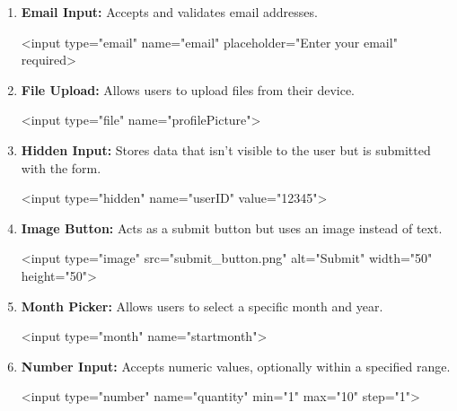 \documentclass{report}
\begin{document}
\begin{itemize}
\begin{enumerate}
            \item \textbf{Email Input:} Accepts and validates email addresses.
                \bigbreak \noindent 
                \begin{htmlcode}
                    <input type="email" name="email" placeholder="Enter your email" required>
                \end{htmlcode}
                
            \item \textbf{File Upload:} Allows users to upload files from their device.
                \bigbreak \noindent 
                \begin{htmlcode}
                    <input type="file" name="profilePicture">
                \end{htmlcode}

            \item \textbf{Hidden Input:} Stores data that isn’t visible to the user but is submitted with the form.
                \bigbreak \noindent 
                \begin{htmlcode}
                    <input type="hidden" name="userID" value="12345">
                \end{htmlcode}
                
            \item \textbf{Image Button:} Acts as a submit button but uses an image instead of text.
                \bigbreak \noindent 
                \begin{htmlcode}
                    <input type="image" src="submit_button.png" alt="Submit" width="50" height="50">
                \end{htmlcode}
                
            \item \textbf{Month Picker:} Allows users to select a specific month and year.
                \bigbreak \noindent 
                \begin{htmlcode}
                    <input type="month" name="startmonth">
                \end{htmlcode}
                
            \item \textbf{Number Input:} Accepts numeric values, optionally within a specified range.
                \bigbreak \noindent 
                \begin{htmlcode}
                    <input type="number" name="quantity" min="1" max="10" step="1">
                \end{htmlcode}
                

\end{enumerate}
\end{itemize}
\end{document}
